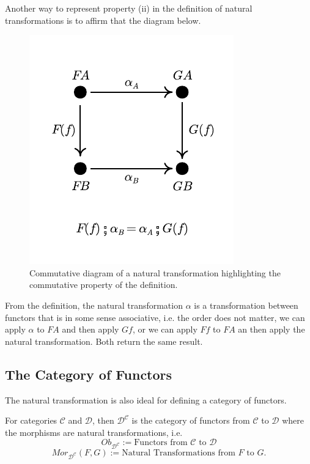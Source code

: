 Another way to represent property (ii) in the definition of natural transformations
is to affirm that the diagram below.

\begin{figure}[H]
  \begin{center}
    \includegraphics{./notebooks/NaturalTransformation.pdf}
  \end{center}
  \caption{Commutative diagram of a natural transformation highlighting the commutative property of the definition.}
  \label{fig:NaturalTransformation}
\end{figure}

From the definition, the natural transformation $\alpha$ is a transformation between functors
that is in some sense associative, i.e. the order does not matter, we can apply $\alpha$
to $FA$ and then apply $Gf$, or we can apply $Ff$ to $FA$ an then apply the natural transformation. Both
return the same result.

\subsection{The Category of Functors}

The natural transformation is also ideal for defining a category of functors.

\begin{definition}
  For categories $\mathcal C$ and $\mathcal D$, then $\mathcal D^{\mathcal C}$ is the category
  of functors from $\mathcal C$ to $\mathcal D$ where the morphisms are natural transformations,
  i.e.
  \begin{displaymath}
    Ob_{\mathcal D^{\mathcal C}} :={\text{Functors from } \mathcal C \text{ to } \mathcal D}
  \end{displaymath}
  \begin{displaymath}
    Mor_{\mathcal D^{\mathcal C}}(F,G) :={\text{Natural Transformations from } 
    F \text{ to } G}.
  \end{displaymath}
\end{definition}


